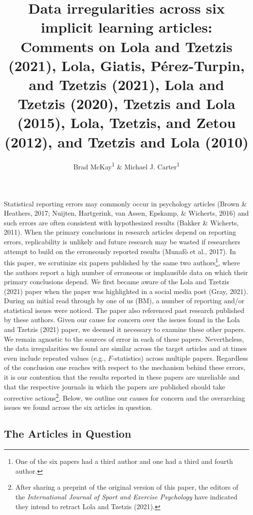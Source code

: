 \documentclass[
  english,
  man, donotrepeattitle,floatsintext]{apa7}
\title{Data irregularities across six implicit learning articles: Comments on Lola and Tzetzis (2021), Lola, Giatis, Pérez-Turpin, and Tzetzis (2021), Lola and Tzetzis (2020), Tzetzis and Lola (2015), Lola, Tzetzis, and Zetou (2012), and Tzetzis and Lola (2010)}
\author{Brad McKay\textsuperscript{1} \& Michael J. Carter\textsuperscript{1}}
\date{}
\affiliation{\vspace{0.5cm}\textsuperscript{1} Department of Kinesiology, McMaster University}
\begin{document}
\maketitle

Statistical reporting errors may commonly occur in psychology articles (Brown \& Heathers, 2017; Nuijten, Hartgerink, van Assen, Epskamp, \& Wicherts, 2016) and such errors are often consistent with hypothesized results (Bakker \& Wicherts, 2011). When the primary conclusions in research articles depend on reporting errors, replicability is unlikely and future research may be wasted if researchers attempt to build on the erroneously reported results (Munafò et al., 2017). In this paper, we scrutinize six papers published by the same two authors\footnote{One of the six papers had a third author and one had a third and fourth author.}, where the authors report a high number of erroneous or implausible data on which their primary conclusions depend. We first became aware of the Lola and Tzetzis (2021) paper when the paper was highlighted in a social media post (Gray, 2021). During an initial read through by one of us (BM), a number of reporting and/or statistical issues were noticed. The paper also referenced past research published by these authors. Given our cause for concern over the issues found in the Lola and Tzetzis (2021) paper, we deemed it necessary to examine these other papers. We remain agnostic to the sources of error in each of these papers. Nevertheless, the data irregularities we found are similar across the target articles and at times even include repeated values (e.g., \(F\)-statistics) across multiple papers. Regardless of the conclusion one reaches with respect to the mechanism behind these errors, it is our contention that the results reported in these papers are unreliable and that the respective journals in which the papers are published should take corrective actions\footnote{After sharing a preprint of the original version of this paper, the editors of the \emph{International Journal of Sport and Exercise Psychology} have indicated they intend to retract Lola and Tzetzis (2021).}. Below, we outline our causes for concern and the overarching issues we found across the six articles in question.

\hypertarget{the-articles-in-question}{%
\subsection{The Articles in Question}\label{the-articles-in-question}}
\end{document}
